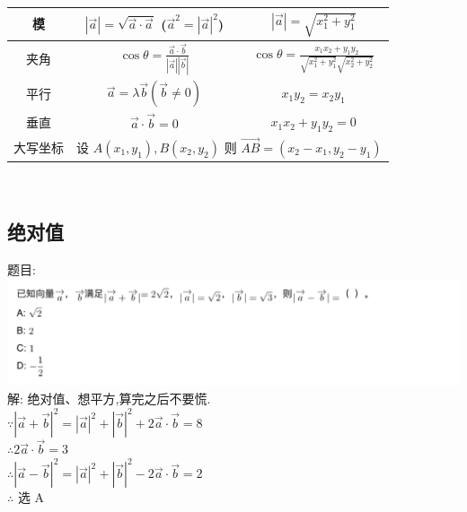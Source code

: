 \documentclass[hyperref, UTF8,11pt,a4paper]{ctexart} %
\begin{document}
{\begin{tabular}{|c|c|c|}
		\hline
		模                             & $|\vec{a} |=\sqrt{\vec{a}  \cdot \vec{a} }$ \qquad ($\vec{a}^{2}=|\vec{a}|^{2}$)                                                                  & $|\vec{a}|=\sqrt{x_{1}^{2}+y_{1}^{2}}$                                                              \\
		\hline
		夹角                           & $\cos \theta=\frac{\vec{a} \cdot \vec{b}}{|\vec{a}||\vec{b}|}$                                                                                    & $\cos \theta=\frac{x_{1} x_{2}+y_{1} y_{2}}{\sqrt{x_{1}^{2}+y_{1}^{2}} \sqrt{x_{2}^{2}+y_{2}^{2}}}$ \\
		\hline
		平行                           & $\vec{a}=\lambda \vec{b}(\vec{b} \neq 0)$                                                                                                         & $x_{1} y_{2}=x_{2} y_{1}$                                                                           \\
		\hline
		垂直                           & $\vec{a} \cdot \vec{b}=0$                                                                                                                         & $x_{1} x_{2}+y_{1} y_{2}=0$                                                                         \\
		\hline
		大写坐标                       & \multicolumn{2}{c}{ 设 $A\left(x_{1}, y_{1}\right), B\left(x_{2}, y_{2}\right)$ 则 $\overrightarrow{A B}=\left(x_{2}-x_{1}, y_{2}-y_{1}\right)$ }                                                                                                       \\
		\hline
	\end{tabular} \\
	\par}

\subsection{绝对值}
{\color{red}  题目: } \\
\includegraphics[width=500pt]  {pic/xiangliang/jueduizhi.jpg} \\
解: {\color{blue} 绝对值、想平方,算完之后不要慌. }\\
$\because |\vec{a}+\vec{b}|^{2}=|\vec{a}|^{2}+|\vec{b}|^{2}+2 \vec{a} \cdot \vec{b}=8$ \\
$ \therefore 2 \vec{a} \cdot \vec{b}=3$ \\
$\therefore |\vec{a}-\vec{b}|^{2}=|\vec{a}|^{2}+|\vec{b}|^{2}-2 \vec{a} \cdot \vec{b}=2$ \\
$\therefore $ 选 A
\end{document}
